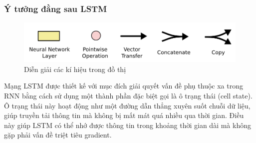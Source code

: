 \subsubsection{Ý tưởng đằng sau LSTM}

\begin{figure}[H]
    \centering
    \includegraphics[width=14cm]{Images/Architecture/lstm1.png}
\caption{Diễn giải các kí hiệu trong đồ thị}
\end{figure}

\indent Mạng LSTM được thiết kế với mục đích giải quyết vấn đề phụ thuộc xa trong RNN bằng cách sử dụng một thành phần đặc biệt gọi là ô trạng thái (cell state). Ô trạng thái này hoạt động như một đường dẫn thẳng xuyên suốt chuỗi dữ liệu, giúp truyền tải thông tin mà không bị mất mát quá nhiều qua thời gian. Điều này giúp LSTM có thể nhớ được thông tin trong khoảng thời gian dài mà không gặp phải vấn đề triệt tiêu gradient.

